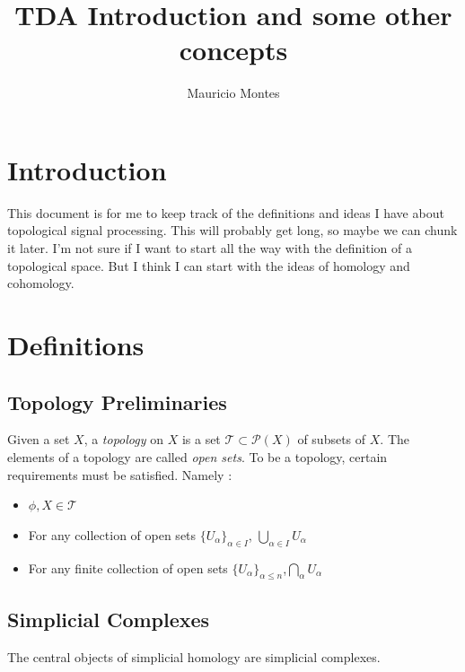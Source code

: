 \documentclass[12pt]{article}
\author{Mauricio Montes}
\title{TDA Introduction and some other concepts}
\begin{document}
\maketitle

\section{Introduction}

This document is for me to keep track of the definitions and ideas I have about topological signal
processing. This will probably get long, so maybe we can chunk it later. I'm not sure if I want to
start all the way with the definition of a topological space. But I think I can start with the ideas
of homology and cohomology. 


\section{Definitions}

\subsection{Topology Preliminaries}

Given a set $X$, a \textit{topology} on $X$ is a set $\mathcal{T} \subset \mathcal{P}(X)$ of subsets
of $X$. The elements of a topology are called \textit{open sets}. To be a topology, certain
requirements must be satisfied. Namely :

\begin{itemize}

  \item $\phi, X \in \mathcal{T}$

  \item For any collection of open sets $\{U_\alpha \}_{\alpha \in I}$, $\bigcup_{\alpha \in I} U_\alpha$

  \item For any finite collection of open sets $\{U_\alpha\}_{\alpha \leq n}$,$\bigcap_{\alpha} U_\alpha$
    
\end{itemize}

\subsection{Simplicial Complexes}

The central objects of simplicial homology are simplicial complexes.
\end{document}
